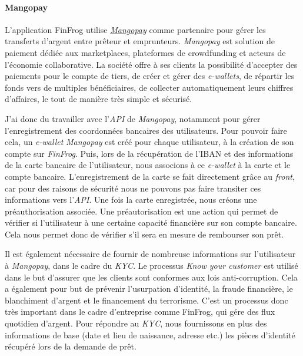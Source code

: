 \documentclass[12pt,a4paper]{article}
\begin{document}
  \paragraph{Mangopay}\label{mangopay}

  L'application FinFrog utilise
  \href{https://www.mangopay.com/fr/}{\emph{Mangopay}} comme partenaire
  pour gérer les transferts d'argent entre prêteur et emprunteurs.
  \emph{Mangopay} est solution de paiement dédiée aux marketplaces,
  plateformes de crowdfunding et acteurs de l'économie collaborative. La
  société offre à ses clients la possibilité d'accepter des paiements pour
  le compte de tiers, de créer et gérer des \emph{e-wallets}, de répartir
  les fonds vers de multiples bénéficiaires, de collecter automatiquement
  leurs chiffres d'affaires, le tout de manière très simple et sécurisé.

  \bigskip

  J'ai donc du travailler avec l'\emph{API} de \emph{Mangopay}, notamment
  pour gérer l'enregistrement des coordonnées bancaires des utilisateurs.
  Pour pouvoir faire cela, un \emph{e-wallet} \emph{Mangopay} est créé
  pour chaque utilisateur, à la création de son compte sur \emph{FinFrog}.
  Puis, lors de la récupération de l'IBAN et des informations de la carte
  bancaire de l'utilisateur, nous associons à ce \emph{e-wallet} à la
  carte et le compte bancaire. L'enregistrement de la carte se fait
  directement grâce au \emph{front}, car pour des raisons de sécurité nous
  ne pouvons pas faire transiter ces informations vers l'\emph{API}. Une
  fois la carte enregistrée, nous créons une préauthorisation associée.
  Une préautorisation est une action qui permet de vérifier si
  l'utilisateur à une certaine capacité financière sur son compte
  bancaire. Cela nous permet donc de vérifier s'il sera en mesure de
  rembourser son prêt.

  \bigskip

  Il est également nécessaire de fournir de nombreuse informations sur
  l'utilisateur à \emph{Mangopay}, dans le cadre du \emph{KYC}. Le
  processus \emph{Know your customer} est utilisé dans le but d'assurer
  que les clients sont conformes aux lois anti-corruption. Cela a
  également pour but de prévenir l'usurpation d'identité, la fraude
  financière, le blanchiment d'argent et le financement du terrorisme.
  C'est un processus donc très important dans le cadre d'entreprise comme
  FinFrog, qui gére des flux quotidien d'argent. Pour répondre au
  \emph{KYC}, nous fournissons en plus des informations de base (date et
  lieu de naissance, adresse etc.) les pièces d'identité récupéré lors de
  la demande de prêt.
\end{document}
